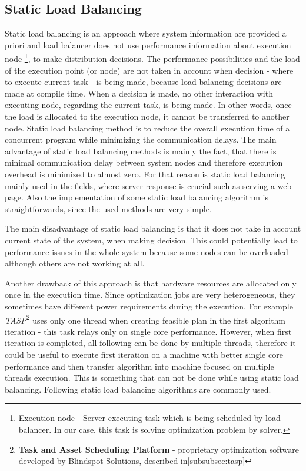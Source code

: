 \subsection{Static Load Balancing}\label{subsec:static-load-balancing}
Static load balancing is an approach where system information are provided a priori
and load balancer does not use performance information about execution node
\footnote{Execution node - Server executing task which is being scheduled by load balancer.
In our case, this task is solving optimization problem by solver.},
to make distribution decisions.
The performance possibilities and the load of the execution point (or node) are not taken in account
when decision - where to execute current task - is being made, because load-balancing decisions are made at compile time.
When a decision is made, no other interaction with executing node, regarding the current task, is being made.
In other words, once the load is allocated to the execution node, it cannot be transferred to another node.
Static load balancing method is to reduce the overall execution time of a concurrent program while minimizing the communication delays\cite{web:loadBalancingInGridComputing}.
The main advantage of static load balancing methods is mainly the fact, that there is minimal communication delay between system nodes
and therefore execution overhead is minimized to almost zero.
For that reason is static load balancing mainly used in the fields, where server response is crucial such as serving a web page.
Also the implementation of some static load balancing algorithm is straightforwards, since the used methods are very simple.

The main disadvantage of static load balancing is that it does not take in account current state of the system, when making decision.
This could potentially lead to performance issues in the whole system because some nodes can be overloaded although others are not working at all.

Another drawback of this approach is that hardware resources are allocated only once in the execution time.
Since optimization jobs are very heterogeneous, they sometimes have different power requirements during the execution.
For example \textit{TASP}\footnote{\textbf{Task and Asset Scheduling Platform} - proprietary optimization software developed by Blindspot Solutions, described in\ref{subsubsec:tasp}}
uses only one thread when creating feasible plan in the first algorithm iteration - this task relays only on single core performance.
However, when first iteration is completed, all following can be done by multiple threads,
therefore it could be useful to execute first iteration on a machine with better single core performance
and then transfer algorithm into machine focused on multiple threads execution.
This is something that can not be done while using static load balancing.\newline
Following static load balancing algorithms are commonly used.

